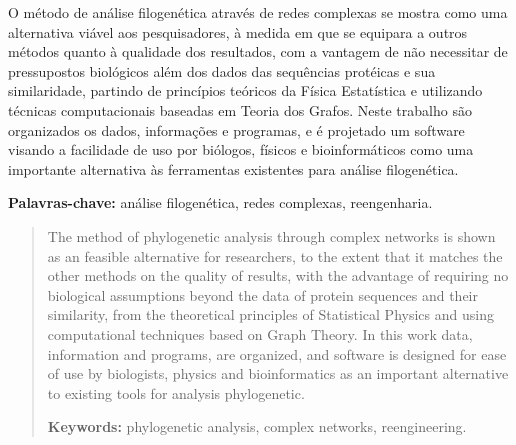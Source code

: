 \documentclass[normaltoc,capchap,capsec,times]{abnt}
\begin{document}



\begin{resumo}
O método de análise filogenética através de redes complexas se mostra como uma alternativa
viável aos pesquisadores, à medida em que se equipara a outros métodos quanto à qualidade dos
resultados, com a vantagem de não necessitar de pressupostos biológicos além dos dados das
sequências protéicas e sua similaridade, partindo de princípios teóricos da Física Estatística e
utilizando técnicas computacionais baseadas em Teoria dos Grafos. Neste trabalho são organizados
os dados, informações e programas, e é projetado um software visando a facilidade de uso por biólogos, 
físicos e bioinformáticos como uma importante alternativa às ferramentas existentes para análise
filogenética.

\textbf{Palavras-chave:}
análise filogenética,
redes complexas, 
reengenharia.
\end{resumo}

\begin{abstract}
The method of phylogenetic analysis through complex networks is shown as an feasible alternative 
for researchers, to the extent that it matches the other methods on the quality of
results, with the advantage of requiring no biological assumptions  beyond the data of
protein sequences and their similarity, from the theoretical principles of Statistical Physics and
using computational techniques based on Graph Theory. In this work data, information and programs,
are organized, and software is designed for ease of use by biologists, 
physics and bioinformatics as an important alternative to existing tools for analysis
phylogenetic.

\textbf{Keywords:} 
phylogenetic analysis,
complex networks,
reengineering.
\end{abstract}

\listadefiguras
\listadesiglas

\sumario







\end{document}
